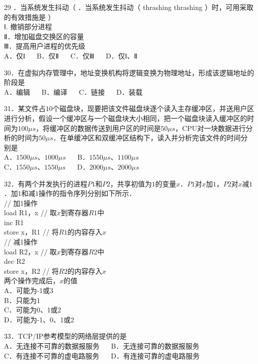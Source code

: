 29 ．当系统发生抖动（ ．当系统发生抖动（ thrashing thrashing ）时，可用采取的有效措施是 ） \\
Ⅰ. 撤销部分进程 \\
Ⅱ．增加磁盘交换区的容量 \\
Ⅲ．提高用户进程的优先级 \\
A．仅Ⅰ $\quad$ B．仅Ⅱ $\quad$ C．仅Ⅲ $\quad$ D．仅Ⅰ、Ⅱ

30．在虚拟内存管理中，地址变换机构将逻辑变换为物理地址，形成该逻辑地址的阶段是 \\
A．编辑 $\quad$ B．编译 $\quad$ C．链接 $\quad$ D．装载

31．某文件占$10$个磁盘块，现要把该文件磁盘块逐个读入主存缓冲区，并送用户区进行分析，假设一个缓冲区与一个磁盘块大小相同，把一个磁盘块读入缓冲区的时间为$100\mu s$，将缓冲区的数据传送到用户区的时间是$50\mu s$，CPU对一块数据进行分析的时间为$50\mu s$．在单缓冲区和双缓冲区结构下，读入并分析完该文件的时间分别是 \\
A．$1500\mu s$、$1000\mu s$ $\quad$ B．$1550\mu s$、$1100\mu s$ \\
C．$1550\mu s$、$1550\mu s$ $\quad$ D．$2000\mu s$、$2000\mu s$

32．有两个并发执行的进程$P1$和$P2$，共享初值为$1$的变量$x$．$P1$对$x$加$1$，$P2$对$x$减$1$．加$1$和减$1$操作的指令序列分别如下所示． \\

// 加1操作 \\
load R1，x  // 取$x$到寄存器$R1$中 \\
inc R1 \\
store x，R1  // 将$R1$的内容存入$x$ \\

// 减1操作 \\
load R2，x // 取$x$到寄存器$R2$中 \\
dec R2 \\
store x，R2 // 将$R2$的内容存入$x$ \\

两个操作完成后，$x$的值 \\
A．可能为-1或3 \\
B．只能为1 \\
C．可能为0、1或2 \\
D．可能为-1、0、1或2

33．TCP/IP参考模型的网络层提供的是 \\
A．无连接不可靠的数据报服务 $\quad$ B．无连接可靠的数据报服务 \\
C．有连接不可靠的虚电路服务 $\quad$ D．有连接可靠的虚电路服务

